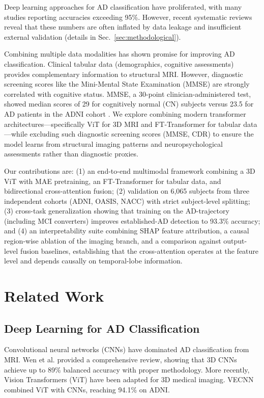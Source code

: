 \documentclass[conference]{IEEEtran}
\begin{document}
Deep learning approaches for AD classification have proliferated, with many studies reporting accuracies exceeding 95\%. However, recent systematic reviews reveal that these numbers are often inflated by data leakage and insufficient external validation (details in Sec.~\ref{sec:methodological}).

Combining multiple data modalities has shown promise for improving AD classification. Clinical tabular data (demographics, cognitive assessments) provides complementary information to structural MRI. However, diagnostic screening scores like the Mini-Mental State Examination (MMSE) are strongly correlated with cognitive status. MMSE, a 30-point clinician-administered test, showed median scores of 29 for cognitively normal (CN) subjects versus 23.5 for AD patients in the ADNI cohort \cite{qiu2020}. We explore combining modern transformer architectures---specifically ViT for 3D MRI and FT-Transformer for tabular data---while excluding such diagnostic screening scores (MMSE, CDR) to ensure the model learns from structural imaging patterns and neuropsychological assessments rather than diagnostic proxies.

Our contributions are: (1) an end-to-end multimodal framework combining a 3D ViT with MAE pretraining, an FT-Transformer for tabular data, and bidirectional cross-attention fusion; (2) validation on 6{,}065 subjects from three independent cohorts (ADNI, OASIS, NACC) with strict subject-level splitting; (3) cross-task generalization showing that training on the AD-trajectory (including MCI converters) improves established-AD detection to 93.3\% accuracy; and (4) an interpretability suite combining SHAP feature attribution, a causal region-wise ablation of the imaging branch, and a comparison against output-level fusion baselines, establishing that the cross-attention operates at the feature level and depends causally on temporal-lobe information.

\section{Related Work}

\subsection{Deep Learning for AD Classification}

Convolutional neural networks (CNNs) have dominated AD classification from MRI. Wen et al. \cite{wen2020} provided a comprehensive review, showing that 3D CNNs achieve up to 89\% balanced accuracy with proper methodology. More recently, Vision Transformers (ViT) \cite{dosovitskiy2021} have been adapted for 3D medical imaging. VECNN \cite{vecnn2024} combined ViT with CNNs, reaching 94.1\% on ADNI.
\end{document}

